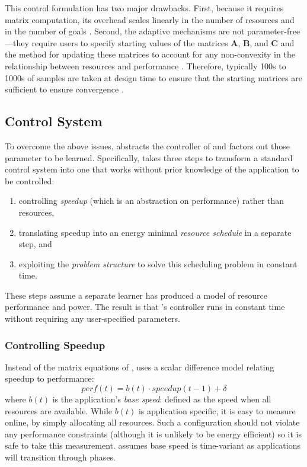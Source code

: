 This control formulation has two major drawbacks.  First, because it
requires matrix computation, its overhead scales linearly in the
number of resources and in the number of goals
\cite{Hellerstein2004a,METE}.  Second, the adaptive mechanisms are not
parameter-free---they require users to specify starting values of the
matrices $\mathbf{A}$, $\mathbf{B}$, and $\mathbf{C}$ and the method
for updating these matrices to account for any non-convexity in the
relationship between resources and performance
\cite{POET,METE,ControlWare,HandbookControl}.  Therefore, typically
100s to 1000s of samples are taken at design time to ensure that the
starting matrices are sufficient to ensure convergence
\cite{FSE2015,sysid,josep-isca2016}.

\subsection{\SYSTEM{} Control System}
To overcome the above issues, \SYSTEM{} abstracts the controller of
 and factors out those parameter to be learned.
Specifically, \SYSTEM{} takes three steps to transform a standard
control system into one that works without prior knowledge of the
application to be controlled:
\begin{enumerate}[leftmargin=1em]
\item controlling \emph{speedup} (which is an abstraction on performance) rather than resources,
\item translating speedup into an energy minimal \emph{resource
    schedule} in a separate step, and
\item exploiting the \emph{problem structure} to solve this scheduling
  problem in constant time.
\end{enumerate}
These steps assume a separate learner has produced a model of resource
performance and power.  The result is that \SYSTEM{}'s controller runs
in constant time without requiring any user-specified parameters.



\subsubsection{Controlling Speedup}
Instead of the matrix equations of , \SYSTEM{}
uses a scalar difference model relating speedup to performance:
\begin{equation}
  perf(t) = b(t) \cdot speedup(t-1) + \delta \label{eqn:speedup}
\end{equation}
where $b(t)$ is the application's \emph{base speed}: defined as the
speed when all resources are available.  While $b(t)$ is application
specific, it is easy to measure online, by simply allocating all
resources. Such a configuration should not violate any performance
constraints (although it is unlikely to be energy efficient) so it is
safe to take this measurement.  \SYSTEM{} assumes base speed is
time-variant as applications will transition through phases.


